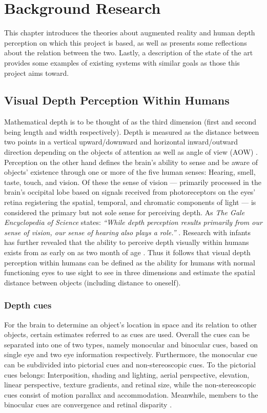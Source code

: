 \chapter{Background Research}\label{ch:backgroundresearch}
This chapter introduces the theories about augmented reality and human depth perception on which this project is based, as well as presents some reflections about the relation between the two. Lastly, a description of the state of the art provides some examples of existing systems with similar goals as those this project aims toward.

\section{Visual Depth Perception Within Humans}
Mathematical depth is to be thought of as the third dimension (first and second being length and width respectively). Depth is measured as the distance between two points in a vertical upward/downward and horizontal inward/outward direction depending on the objects of attention as well as angle of view (AOW) \cite{Gale}. Perception on the other hand defines the brain’s ability to sense and be aware of objects' existence through one or more of the five human senses: Hearing, smell, taste, touch, and vision. Of these the sense of vision --- primarily processed in the brain’s occipital lobe based on signals received from photoreceptors on the eyes’ retina registering the spatial, temporal, and chromatic components of light \cite{Spector2003} --- is considered the primary but not sole sense for perceiving depth. As \textit{The Gale Encyclopedia of Science} states: \textit{“While depth perception results primarily from our sense of vision, our sense of hearing also plays a role.”} \cite{Gale}. Research with infants has further revealed that the ability to perceive depth visually within humans exists from as early on as two month of age \cite{Gale}. Thus it follows that visual depth perception within humans can be defined as the ability for humans with normal functioning eyes to use sight to see in three dimensions and estimate the spatial distance between objects (including distance to oneself).

\subsection{Depth cues}
For the brain to determine an object’s location in space and its relation to other objects, certain estimates referred to as cues are used. Overall the cues can be separated into one of two types, namely monocular and binocular cues, based on single eye and two eye information respectively. Furthermore, the monocular cue can be subdivided into pictorial cues and non-stereoscopic cues. To the pictorial cues belongs: Interposition, shading and lighting, aerial perspective, elevation, linear perspective, texture gradients, and retinal size, while the non-stereoscopic cues consist of motion parallax and accommodation. Meanwhile, members to the binocular cues are convergence and retinal disparity \cite{Gale}. 

